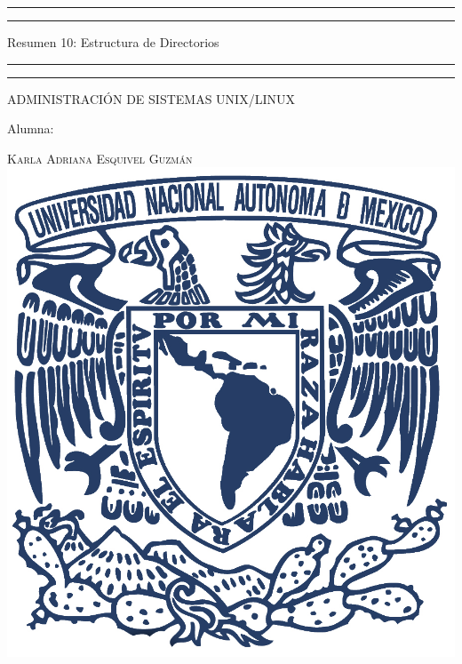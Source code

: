 \documentclass[a4paper, 11pt, oneside]{article}
\begin{document}
 

\begin{titlepage} 

	\centering 
	
	\scshape 
	
	\vspace*{\baselineskip} 
	
	
	
	\rule{\textwidth}{1.6pt}\vspace*{-\baselineskip}\vspace*{2pt} 
	\rule{\textwidth}{0.4pt} 
	
	\vspace{0.75\baselineskip} 
	
	{\LARGE Resumen 10: Estructura de Directorios}	
	\vspace{0.75\baselineskip} 
	
	\rule{\textwidth}{0.4pt}\vspace*{-\baselineskip}\vspace{3.2pt}
	\rule{\textwidth}{1.6pt} 
	
	\vspace{2\baselineskip} 
	

	ADMINISTRACIÓN DE SISTEMAS UNIX/LINUX
	
	\vspace*{3\baselineskip} 
	
	
	
	Alumna:
	
	\vspace{0.5\baselineskip} 
	
	{\scshape\Large Karla Adriana Esquivel Guzmán \\} 
	\vspace{0.5\baselineskip} 
	\vfill
	\includegraphics{unam.jpg}
	

\end{titlepage}
\end{document}
